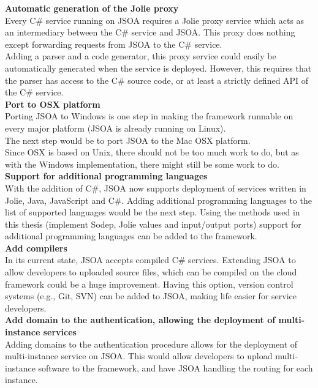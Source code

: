 \documentclass[12pt,a4paper]{article}
\begin{document}
\textbf{Automatic generation of the Jolie proxy}\\
Every C\# service running on JSOA requires a Jolie proxy service which acts as an intermediary between the C\# service and JSOA. This proxy does nothing except forwarding requests from JSOA to the C\# service.\\
Adding a parser and a code generator, this proxy service could easily be automatically generated when the service is deployed. However, this requires that the parser has access to the C\# source code, or at least a strictly defined API of the C\# service. \\

\textbf{Port to OSX platform}\\
Porting JSOA to Windows is one step in making the framework runnable on every major platform (JSOA is already running on Linux).\\
The next step would be to port JSOA to the Mac OSX platform.\\
Since OSX is based on Unix, there should not be too much work to do, but as with the Windows implementation, there might still be some work to do.\\

\textbf{Support for additional programming languages}\\
With the addition of C\#, JSOA now supports deployment of services written in Jolie, Java, JavaScript and C\#. Adding additional programming languages to the list of supported languages would be the next step. Using the methods used in this thesis (implement Sodep, Jolie values and input/output ports) support for additional programming languages can be added to the framework.\\

\textbf{Add compilers}\\
In its current state, JSOA accepts compiled C\# services. Extending JSOA to allow developers to uploaded source files, which can be compiled on the cloud framework could be a huge improvement. Having this option, version control systems (e.g., Git, SVN) can be added to JSOA, making life easier for service developers.\\ 

\textbf{Add domain to the authentication, allowing the deployment of multi-instance services}\\
Adding domains to the authentication procedure allows for the deployment of multi-instance service on JSOA. This would allow developers to upload multi-instance software to the framework, and have JSOA handling the routing for each instance.
\end{document}
